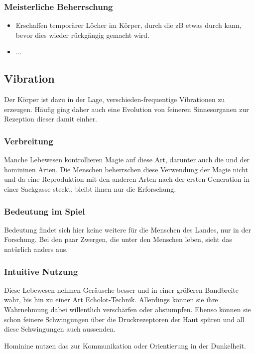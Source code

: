 \subsubsection{Meisterliche Beherrschung} 
\begin{itemize}
	\item Erschaffen temporärer Löcher im Körper, durch die zB etwas durch kann, bevor dies wieder rückgängig gemacht wird.
	\item ...
\end{itemize}



\subsection{Vibration}\label{sec:vibrationsmagie}
Der Körper ist dazu in der Lage, verschieden-frequentige Vibrationen zu erzeugen. Häufig ging daher auch eine Evolution von feineren Sinnesorganen zur Rezeption dieser damit einher.

\subsubsection{Verbreitung}
Manche Lebewesen kontrollieren Magie auf diese Art, darunter auch die  und  der homininen Arten. Die Menschen beherrschen diese Verwendung der Magie nicht und da eine Reproduktion mit den anderen Arten nach der ersten Generation in einer Sackgasse steckt, bleibt ihnen nur die Erforschung.

\subsubsection{Bedeutung im Spiel}
Bedeutung findet sich hier keine weitere für die Menschen des Landes, nur in der Forschung. Bei den paar Zwergen, die unter den Menschen leben, sieht das natürlich anders aus.

\subsubsection{Intuitive Nutzung}
Diese Lebewesen nehmen Geräusche besser und in einer größeren Bandbreite wahr, bis hin zu einer Art Echolot-Technik. Allerdings können sie ihre Wahrnehmung dabei willentlich verschärfen oder abstumpfen. Ebenso können sie schon feinere Schwingungen über die Druckrezeptoren der Haut spüren und all diese Schwingungen auch aussenden.

Hominine nutzen das zur Kommunikation oder Orientierung in der Dunkelheit. 

